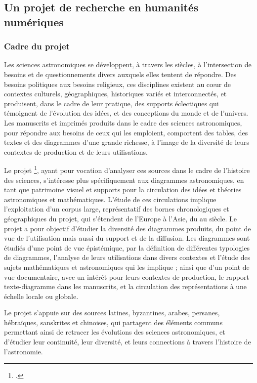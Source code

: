 
\subsection{Un projet de recherche en humanités numériques}
        \subsubsection{Cadre du projet}
Les sciences astronomiques se développent, à travers les siècles, à l’intersection de besoins et de questionnements divers auxquels elles tentent de répondre. Des besoins politiques aux besoins religieux, ces disciplines existent au cœur de contextes culturels, géographiques, historiques variés et interconnectés, et produisent, dans le cadre de leur pratique, des supports éclectiques qui témoignent de l'évolution des idées, et des conceptions du monde et de l'univers. Les manuscrits et imprimés produits dans le cadre des sciences astronomiques, pour répondre aux besoins de ceux qui les emploient, comportent des tables, des textes et des diagrammes d’une grande richesse, à l’image de la diversité de leurs contextes de production et de leurs utilisations. 

Le projet \eida\footcite{EdIterAnalyserDiagrammes}, ayant pour vocation d'analyser ces sources dans le cadre de l'histoire des sciences, s’intéresse plus spécifiquement aux diagrammes astronomiques, en tant que patrimoine visuel et supports pour la circulation des idées et théories astronomiques et mathématiques. L’étude de ces circulations implique l’exploitation d’un corpus large, représentatif des bornes chronologiques et géographiques du projet, qui s’étendent de l’Europe à l’Asie, du \viii au \xviii siècle. Le projet \eida a pour objectif d’étudier la diversité des diagrammes produits, du point de vue de l’utilisation mais aussi du support et de la diffusion. Les diagrammes sont étudiés d’une point de vue épistémique, par la définition de différentes typologies de diagrammes, l’analyse de leurs utilisations dans divers contextes et l’étude des sujets mathématiques et astronomiques qui les implique ; ainsi que d’un point de vue documentaire, avec un intérêt pour leurs contextes de production, le rapport texte-diagramme dans les manuscrits, et la circulation des représentations à une échelle locale ou globale. 

Le projet s’appuie sur des sources latines, byzantines, arabes, persanes, hébraïques, sanskrites et chinoises, qui partagent des éléments communs permettant ainsi de retracer les évolutions des sciences astronomiques, et d’étudier leur continuité, leur diversité, et leurs connections à travers l’histoire de l’astronomie.

